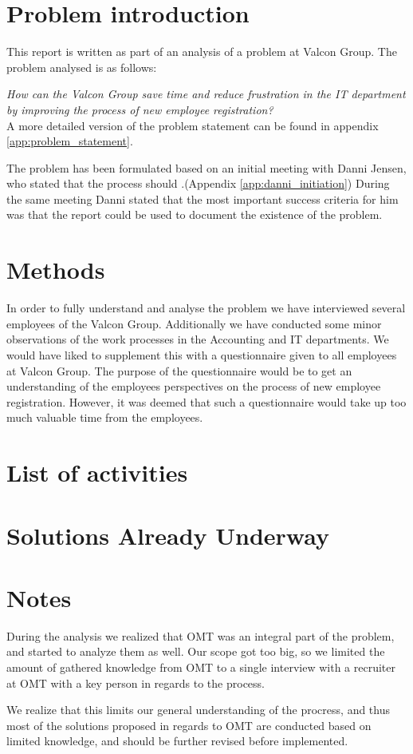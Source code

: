 \section{Problem introduction}
This report is written as part of an analysis of a problem at Valcon Group.
The problem analysed is as follows:

\emph{How can the Valcon Group save time and reduce frustration in the IT department by improving the process of new employee registration?}
\\
A more detailed version of the problem statement can be found in appendix \ref{app:problem_statement}.

The problem has been formulated based on an initial meeting with Danni Jensen, who stated that the process should .(Appendix \ref{app:danni_initiation})
During the same meeting Danni stated that the most important success criteria for him was that the report could be used to document the existence of the problem.

\section{Methods}
In order to fully understand and analyse the problem we have interviewed several employees of the Valcon Group.
Additionally we have conducted some minor observations of the work processes in the Accounting and IT departments.
We would have liked to supplement this with a questionnaire given to all employees at Valcon Group.
The purpose of the questionnaire would be to get an understanding of the employees perspectives on the process of new employee registration.
However, it was deemed that such a questionnaire would take up too much valuable time from the employees.
\section{List of activities}


\section{Solutions Already Underway}


\section{Notes}
During the analysis we realized that OMT was an integral part of the problem, and started to analyze them as well.
Our scope got too big, so we limited the amount of gathered knowledge from OMT to a single interview with a recruiter at OMT with a key person in regards to the process. 

We realize that this limits our general understanding of the procress, and thus most of the solutions proposed in regards to OMT are conducted based on limited knowledge, and should be further revised before implemented. 
